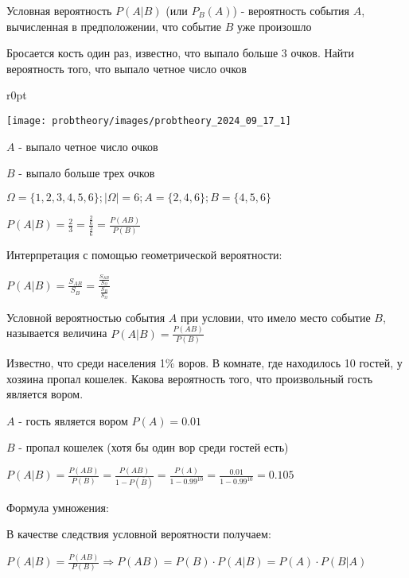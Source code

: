 \documentclass[12pt]{article}
\begin{document}
    Условная вероятность $P(A|B)$ (или $P_B(A)$) - вероятность события $A$, вычисленная в предположении, что событие $B$ уже произошло

    \Ex Бросается кость один раз, известно, что выпало больше 3 очков. Найти вероятность того, что выпало четное число очков

    \smallvspace

    \begin{minipage}{\linewidth}
        \begin{wrapfigure}{r}{0pt}
            \begin{center}
                \texttt{[image: probtheory/images/probtheory\_2024\_09\_17\_1]}
            \end{center}
        \end{wrapfigure}

        $A$ - выпало четное число очков

        $B$ - выпало больше трех очков

        $\Omega = \{1, 2, 3, 4, 5, 6\}; |\Omega| = 6; A = \{2, 4, 6\}; B = \{4, 5, 6\}$

        $P(A|B) = \frac{2}{3} = \frac{\frac{2}{6}}{\frac{3}{6}} = \frac{P(AB)}{P(B)}$


        Интерпретация с помощью геометрической вероятности:

        $P(A|B) = \frac{S_{AB}}{S_B} = \frac{\frac{S_{AB}}{S_\Omega}}{\frac{S_B}{S_\Omega}}$
    \end{minipage}

    \Def Условной вероятностью события $A$ при условии, что имело место событие $B$, называется величина $P(A|B) = \frac{P(AB)}{P(B)}$

    \Ex Известно, что среди населения 1\% воров. В комнате, где находилось 10 гостей, у хозяина пропал кошелек. Какова вероятность того, что произвольный гость является вором.

    $A$ - гость является вором $P(A) = 0.01$

    $B$ - пропал кошелек (хотя бы один вор среди гостей есть)

    $P(A|B) = \frac{P(AB)}{P(B)} = \frac{P(AB)}{1 - P(\overline{B})} = \frac{P(A)}{1 - 0.99^{10}} = \frac{0.01}{1 - 0.99^{10}} = 0.105$

    \hypertarget{eventsmultiplicationformula}{}

    Формула умножения:

    В качестве следствия условной вероятности получаем:

    $P(A|B) = \frac{P(AB)}{P(B)} \Longrightarrow P(AB) = P(B) \cdot P(A|B) = P(A) \cdot P(B|A)$
\end{document}

